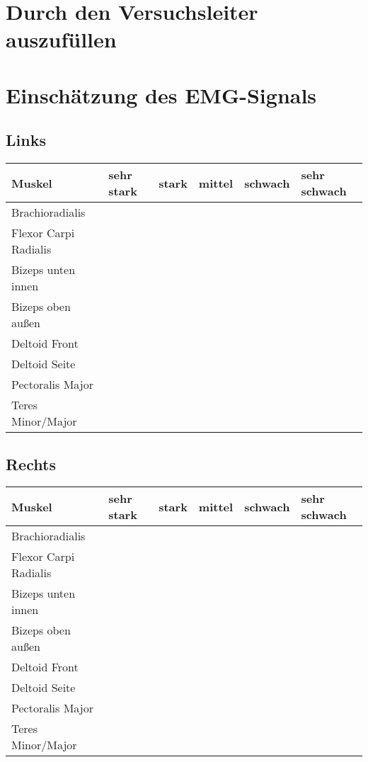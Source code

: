 \documentclass{article}
\begin{document}
\newpage

\section*{Durch den Versuchsleiter auszuf\"ullen}
\section{Einschätzung des EMG-Signals}
\subsection{Links}
\begin{center}
  \begin{tabular}{ |p{} |  p{} | p{} | p{} | p{} | p{} |  }
    \hline
    Muskel & sehr stark & stark & mittel & schwach & sehr schwach \\ \hline
    Brachioradialis  & & & & &\\ \hline
    Flexor Carpi Radialis  & & & & &\\ \hline
    Bizeps unten innen & & & & & \\ \hline
    Bizeps oben au\ss en & & & & &\\ \hline
    Deltoid Front & & & & &\\ \hline
    Deltoid Seite& & & & &\\ \hline
    Pectoralis Major & & & & &\\ \hline
    Teres Minor/Major & & & & &\\ \hline 
  \end{tabular}
\end{center}

\subsection{Rechts}
\begin{center}
  \begin{tabular}{ |p{} |  p{} | p{} | p{} | p{} | p{} |  }
    \hline
    Muskel & sehr stark & stark & mittel & schwach & sehr schwach \\ \hline
    Brachioradialis  & & & & &\\ \hline
    Flexor Carpi Radialis  & & & & &\\ \hline
    Bizeps unten innen & & & & & \\ \hline
    Bizeps oben au\ss en & & & & &\\ \hline
    Deltoid Front & & & & &\\ \hline
    Deltoid Seite& & & & &\\ \hline
    Pectoralis Major & & & & &\\ \hline
    Teres Minor/Major & & & & &\\ \hline 
  \end{tabular}
\end{center}
\end{document}
